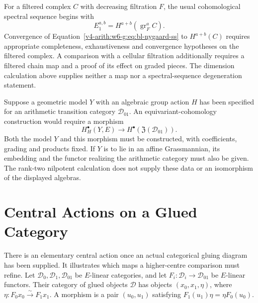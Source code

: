 For a filtered complex $C$ with decreasing filtration $F$, the
usual cohomological spectral sequence begins with
\begin{equation}
\label{v4-arith:w6-g:eq:bl-nygaard-ss}
 E_1^{a,b}=H^{a+b}(\operatorname{gr}_F^a C).
\end{equation}
Convergence of Equation~\eqref{v4-arith:w6-g:eq:bl-nygaard-ss}
to $H^{a+b}(C)$ requires appropriate completeness,
exhaustiveness and convergence hypotheses on the filtered complex.
A comparison with a cellular filtration additionally requires a
filtered chain map and a proof of its effect on graded pieces.
The dimension calculation above supplies neither a map nor a
spectral-sequence degeneration statement.

\begin{remark}
\label{v4-arith:w6-g:thm:bfm-equivariant}
Suppose a geometric model $Y$ with an algebraic group action $H$
has been specified for an arithmetic transition category
$\mathcal D_{01}$. An equivariant-cohomology construction would
require a morphism
\begin{equation}
\label{v4-arith:w6-g:eq:bfm-centre}
 H_H^\bullet(Y,E)\longrightarrow
 H^\bullet(\mathfrak Z(\mathcal D_{01})).
\end{equation}
Both the model $Y$ and this morphism must be constructed, with
coefficients, grading and products fixed. If $Y$ is to lie in an
affine Grassmannian, its embedding and the functor realizing the
arithmetic category must also be given. The rank-two nilpotent
calculation does not supply these data or an isomorphism of the
displayed algebras.
\end{remark}

\section{Central Actions on a Glued Category}

There is an elementary central action once an actual categorical
gluing diagram has been supplied. It illustrates which maps a
higher-centre comparison must refine.
Let $\mathcal D_0,\mathcal D_1,\mathcal D_{01}$ be $E$-linear
categories, and let $F_i:\mathcal D_i\to\mathcal D_{01}$ be
$E$-linear functors.
Their category of glued objects $\mathcal D$ has objects
$(x_0,x_1,\eta)$, where
$\eta:F_0x_0\xrightarrow{\sim}F_1x_1$.
A morphism is a pair $(u_0,u_1)$ satisfying
$F_1(u_1)\eta=\eta F_0(u_0)$.

